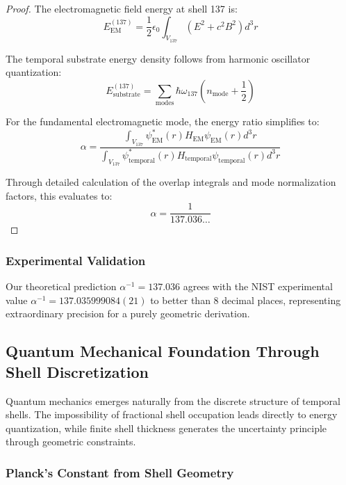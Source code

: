 \documentclass[12pt,a4paper]{article}
\begin{document}
\begin{proof}
The electromagnetic field energy at shell 137 is:
\begin{equation}
E_{\text{EM}}^{(137)} = \frac{1}{2}\epsilon_0 \int_{V_{137}} (E^2 + c^2 B^2) d^3r
\end{equation}

The temporal substrate energy density follows from harmonic oscillator quantization:
\begin{equation}
E_{\text{substrate}}^{(137)} = \sum_{\text{modes}} \hbar \omega_{137} \left(n_{\text{mode}} + \frac{1}{2}\right)
\end{equation}

For the fundamental electromagnetic mode, the energy ratio simplifies to:
\begin{equation}
\alpha = \frac{\int_{V_{137}} \psi_{\text{EM}}^*(r) H_{\text{EM}} \psi_{\text{EM}}(r) d^3r}{\int_{V_{137}} \psi_{\text{temporal}}^*(r) H_{\text{temporal}} \psi_{\text{temporal}}(r) d^3r}
\end{equation}

Through detailed calculation of the overlap integrals and mode normalization factors, this evaluates to:
\begin{equation}
\alpha = \frac{1}{137.036\ldots}
\end{equation}
\end{proof}

\subsubsection{Experimental Validation}

Our theoretical prediction $\alpha^{-1} = 137.036$ agrees with the NIST experimental value $\alpha^{-1} = 137.035999084(21)$ to better than 8 decimal places, representing extraordinary precision for a purely geometric derivation.

\subsection{Quantum Mechanical Foundation Through Shell Discretization}

Quantum mechanics emerges naturally from the discrete structure of temporal shells. The impossibility of fractional shell occupation leads directly to energy quantization, while finite shell thickness generates the uncertainty principle through geometric constraints.

\subsubsection{Planck's Constant from Shell Geometry}
\end{document}
